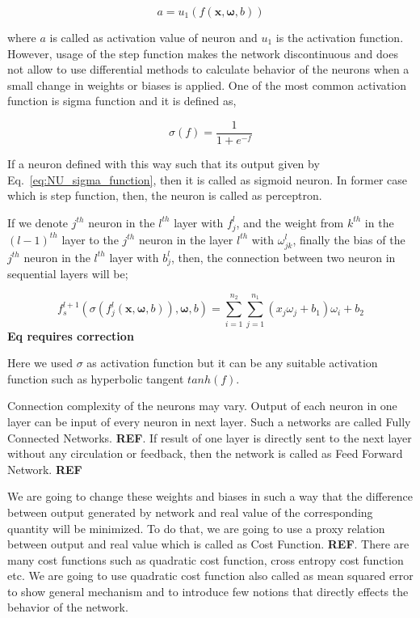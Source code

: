 \documentclass[a4paper,times,12pt]{article}
\begin{document}
\begin{equation}
\label{eq:NU_step_function}
a = u_1(f(\boldsymbol{x}, \boldsymbol{\omega}, b))
\end{equation}

where $a$ is called as activation value of neuron and $u_1$ is the activation function. However, usage of the step function makes the network discontinuous and does not allow to use differential methods to calculate behavior of the neurons when a small change in weights or biases is applied. One of the most common activation function is sigma function and it is defined as,

\begin{equation}
\label{eq:NU_sigma_function}
\sigma(f) = \frac{1}{1 + e^{-f}}
\end{equation}

If a neuron defined with this way such that its output given by Eq.~\ref{eq:NU_sigma_function}, then it is called as sigmoid neuron. In former case which is step function, then, the neuron is called as perceptron. 

If we denote $j^{th}$ neuron in the $l^{th}$ layer with $f_j^l$, and the weight from $k^{th}$ in the $(l-1)^{th}$ layer to the $j^{th}$ neuron in the layer $l^{th}$ with $\omega_{jk}^l$, finally the bias of the $j^{th}$ neuron in the $l^{th}$ layer with ${b_j^l}$, then, the connection between two neuron in sequential layers will be;

\begin{equation}
\label{eq:NU_neuron_connection}
f_s^{l+1}(\sigma(f_j^{l}(\boldsymbol{x}, \boldsymbol{\omega}, b)), \boldsymbol{\omega}, b) = \sum\limits_{i=1}^{n_2} \sum\limits_{j=1}^{n_1} (x_j\omega_j + b_1)\omega_i + b_2
\end{equation}
\textbf{Eq requires correction}

Here we used $\sigma$ as activation function but it can be any suitable activation function such as hyperbolic tangent $tanh(f)$.  

Connection complexity of the neurons may vary. Output of each neuron in one layer can be input of every neuron in next layer. Such a networks are called Fully Connected Networks. \textbf{REF}. If result of one layer is directly sent to the next layer without any circulation or feedback, then the network is called as Feed Forward Network. \textbf{REF}

We are going to change these weights and biases in such a way that the difference between output generated by network and real value of the corresponding quantity will be minimized. To do that, we are going to use a proxy relation between output and real value which is called as Cost Function. \textbf{REF}. There are many cost functions such as quadratic cost function, cross entropy cost function etc. We are going to use quadratic cost function also called as mean squared error to show general mechanism and to introduce few notions that directly effects the behavior of the network. 
\end{document}
